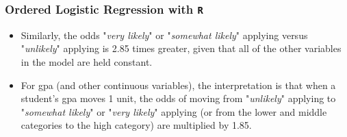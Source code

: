 \documentclass[00-GLMregslides.tex]{subfiles}
\begin{document}
\begin{frame}
		\frametitle{Ordered Logistic Regression with \texttt{R} }
		\Large
\begin{itemize}
\item Similarly, the odds "\textit{very likely}" or "\textit{somewhat likely}" applying versus "\textit{unlikely}" applying is 2.85 times greater, 
given that all of the other variables in the model are held constant.
\item For gpa (and other continuous variables), the interpretation is that when a student's gpa moves 1 unit, 
the odds of moving from "\textit{unlikely}" applying to "\textit{somewhat likely}" or "\textit{very likely}" applying (or from the lower and middle categories to the high category) are multiplied by 1.85.
\end{itemize}
\end{frame}
\end{document}
